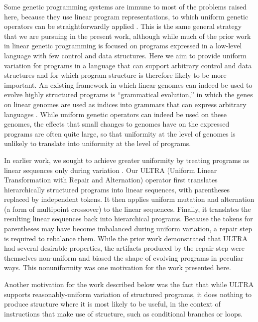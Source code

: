 \documentclass[graybox]{svmult}
\begin{document}
Some genetic programming systems are immune to most of the problems raised here, because they use linear program representations, to which uniform genetic operators can be straightforwardly applied \cite{journals/ijait/OlteanGDM09}. This is the same general strategy that we are pursuing in the present work, although while much of the prior work in linear genetic programming is focused on programs expressed in a low-level language with few control and data structures. Here we aim to provide uniform variation for programs in a language that can support arbitrary control and data structures and for which program structure is therefore likely to be more important. An existing framework in which linear genomes can indeed be used to evolve highly structured programs is ``grammatical evolution,'' in which the genes on linear genomes are used as indices into grammars that can express arbitrary languages \cite{ryan:1998:geepal}. While uniform genetic operators can indeed be used on these genomes, the effects that small changes to genomes have on the expressed programs are often quite large, so that uniformity at the level of genomes is unlikely to translate into uniformity at the level of programs.

In earlier work, we sought to achieve greater uniformity by treating programs as linear sequences only during variation \cite{Spector:2013:GPTP}. Our ULTRA (Uniform Linear Transformation with Repair and Alternation) operator first translates hierarchically structured programs into linear sequences, with parentheses replaced by independent tokens. It then applies uniform mutation and alternation (a form of multipoint crossover) to the linear sequences. Finally, it translates the resulting linear sequences back into hierarchical programs. Because the tokens for parentheses may have become imbalanced during uniform variation, a repair step is required to rebalance them. While the prior work demonstrated that ULTRA had several desirable properties, the artifacts produced by the repair step were themselves non-uniform and biased the shape of evolving programs in peculiar ways. This nonuniformity was one motivation for the work presented here.

Another motivation for the work described below was the fact that while ULTRA supports reasonably-uniform variation of structured programs, it does nothing to produce structure where it is most likely to be useful, in the context of instructions that make use of structure, such as conditional branches or loops.
\end{document}
